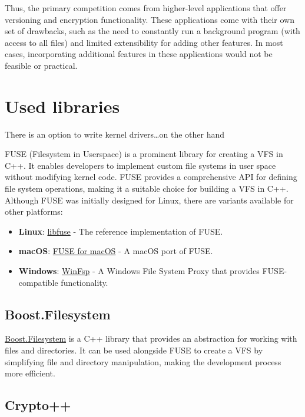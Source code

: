 Thus, the primary competition comes from higher-level applications that offer versioning and encryption functionality.
These applications come with their own set of drawbacks, such as the need to constantly run a background program (with access to all files) and limited extensibility for adding other features.
In most cases, incorporating additional features in these applications would not be feasible or practical.


\section{Used libraries}\label{sec:used-libraries}

There is an option to write kernel drivers\ldots on the other hand

FUSE (Filesystem in Userspace) is a prominent library for creating a VFS in C++.
It enables developers to implement custom file systems in user space without modifying kernel code.
FUSE provides a comprehensive API for defining file system operations, making it a suitable choice for building a VFS in C++.
Although FUSE was initially designed for Linux, there are variants available for other platforms:

\begin{itemize}
\item \textbf{Linux}: \href{https://github.com/libfuse/libfuse}{libfuse} - The reference implementation of FUSE\@.
\item \textbf{macOS}: \href{https://osxfuse.github.io/}{FUSE for macOS} - A macOS port of FUSE\@.
\item \textbf{Windows}: \href{https://github.com/billziss-gh/winfsp}{WinFsp} - A Windows File System Proxy that provides FUSE-compatible functionality.
\end{itemize}

\subsection{Boost.Filesystem}\label{subsec:boost.filesystem}

\href{https://www.boost.org/doc/libs/1_78_0/libs/filesystem/doc/index.htm}{Boost.Filesystem} is a C++ library that provides an abstraction for working with files and directories.
It can be used alongside FUSE to create a VFS by simplifying file and directory manipulation, making the development process more efficient.

\subsection{Crypto++}\label{subsec:crypto++}

